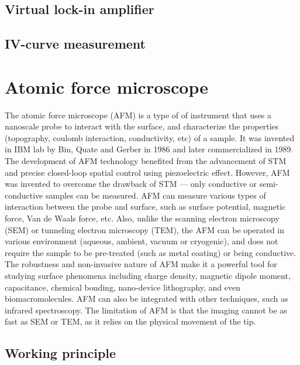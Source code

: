 \documentclass[pdflatex, sectionletters, 12pt]{pittetd}    %
\begin{document}
\subsection{Virtual lock-in amplifier}

\subsection{IV-curve measurement}

\section{Atomic force microscope}
\label{SEC:AFM}

The atomic force microscope (AFM) is a type of of instrument that uses a nanoscale probe to interact with the surface, and characterize the properties (topography, coulomb interaction, conductivity, etc) of a sample. It was invented in IBM lab by Bin, Quate and Gerber \cite{} in 1986 and later commercialized in 1989. The development of AFM technology benefited from the advancement of STM and precise closed-loop spatial control using piezoelectric effect. However, AFM was invented to overcome the drawback of STM --- only conductive or semi-conductive samples can be measured. AFM can measure various types of interaction between the probe and surface, such as surface potential, magnetic force, Van de Waals force, etc. Also, unlike the scanning electron microscopy (SEM) or tunneling electron microscopy (TEM), the AFM can be operated in various environment (aqueous, ambient, vacuum or cryogenic), and does not require the sample to be pre-treated (such as metal coating) or being conductive. The robustness and non-invasive nature of AFM make it a powerful tool for studying surface phenomena including charge density, magnetic dipole moment, capacitance, chemical bonding, nano-device lithography, and even biomacromolecules. AFM can also be integrated with other techniques, such as infrared spectroscopy\cite{}. The limitation of AFM is that the imaging cannot be as fast as SEM or TEM, as it relies on the physical movement of the tip.

\subsection{Working principle}
\end{document}

